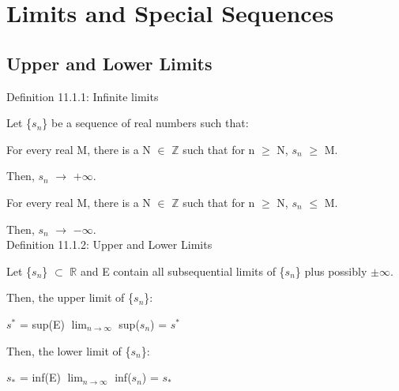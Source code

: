 \newpage

\section[Day 11: Limits \& Special Sequences]{Limits and Special Sequences}

\subsection{ Upper and Lower Limits } 

{ \color{blue} Definition 11.1.1: Infinite limits } 

	\begin{adjustbox}{minipage=14cm, right, vspace=0.1cm 0cm}
		Let \{$s_n$\} be a sequence of real numbers such that:

		\hspace{1cm}
		For every real M, there is a N $\in$ $\mathbb{Z}$ such that
		for n $\geq$ N, $s_n$ $\geq$ M.

		\hspace{2cm}
		Then, $s_n$ $\rightarrow$ $+\infty$.

		\hspace{1cm}
		For every real M, there is a N $\in$ $\mathbb{Z}$ such that
		for n $\geq$ N, $s_n$ $\leq$ M.

		\hspace{2cm}
		Then, $s_n$ $\rightarrow$ $-\infty$. \\
	\end{adjustbox}

{ \color{blue} Definition 11.1.2: Upper and Lower Limits } 

	\begin{adjustbox}{minipage=14cm, right, vspace=0.1cm 0cm}
		Let \{$s_n$\} $\subset$ $\mathbb{R}$
		and E contain all subsequential limits of \{$s_n$\}
		plus possibly $\pm$$\infty$.

		Then, the upper limit of \{$s_n$\}:

		\hspace{1cm}
		$s^*$ = sup(E) 
		\hspace{1cm} 
		$\lim_{n \rightarrow \infty}$ sup($s_n$) = $s^*$

		Then, the lower limit of \{$s_n$\}:

		\hspace{1cm}
		$s_*$ = inf(E) 
		\hspace{1.2cm} 
		$\lim_{n \rightarrow \infty}$ inf($s_n$) = $s_*$
	\end{adjustbox}

